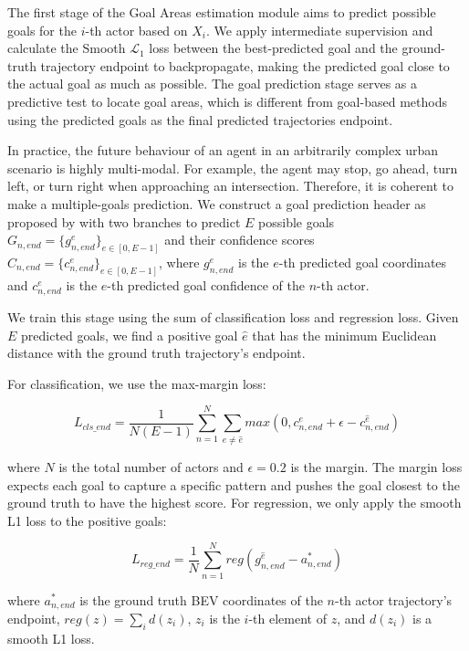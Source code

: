 The first stage of the Goal Areas estimation module aims to predict possible goals for the $i$-th actor based on $X_i$. We apply intermediate supervision and calculate the Smooth $\mathcal{L}_1$ loss between the best-predicted goal and the ground-truth trajectory endpoint to backpropagate, making the predicted goal close to the actual goal as much as possible. The goal prediction stage serves as a predictive test to locate goal areas, which is different from goal-based methods using the predicted goals as the final predicted trajectories endpoint. 

In practice, the future behaviour of an agent in an arbitrarily complex urban scenario is highly multi-modal. For example, the agent may stop, go ahead, turn left, or turn right when approaching an intersection. Therefore, it is coherent to make a multiple-goals prediction. We construct a goal prediction header as proposed by \cite{wang2022ganet} with two branches to predict $E$ possible goals $G_{n,end} =\{g_{n,end}^e\}_{e \in [0,E-1]}$ and their confidence scores $C_{n,end} = \{c_{n,end}^e\}_{e \in [0,E-1]}$, where $g_{n,end}^e$ is the $e$-th predicted goal coordinates and $c_{n,end}^e$ is the $e$-th predicted goal confidence of the $n$-th actor.

We train this stage using the sum of classification loss and regression loss. Given $E$ predicted goals, we find a positive goal $\hat{e}$ that has the minimum Euclidean distance with the ground truth trajectory's endpoint. 

For classification, we use the max-margin loss:

\begin{equation}
	L_{cls\_end}=\frac{1}{N(E-1)}\sum_{n=1}^N\sum_{e\neq \hat{e}}{max(0,c^e_{n,end}+\epsilon -c^{\hat{e}}_{n,end})}
\end{equation}

where $N$ is the total number of actors and $\epsilon=0.2$ is the margin. The margin loss expects each goal to capture a specific pattern and pushes the goal closest to the ground truth to have the highest score. For regression, we only apply the smooth L1 loss to the positive goals:

\begin{equation}
	L_{reg\_end}=\frac{1}{N}\sum_{n=1}^N{reg(g_{n,end}^{\hat{e}}-a^{*}_{n,end})}
\end{equation}

where $a^{*}_{n,end}$ is the ground truth \ac{BEV} coordinates of the $n$-th actor trajectory's endpoint, $reg(z) = \sum_id(z_i)$, $z_i$ is the $i$-th element of $z$, and $d(z_i)$ is a smooth L1 loss.

